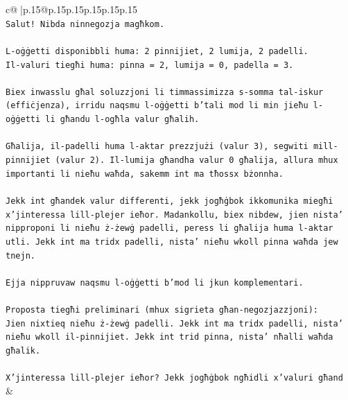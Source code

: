 \documentclass{article}
\begin{document}
{\begin{supertabular}{c@{$\;$}|p{.15\linewidth}@{}p{.15\linewidth}p{.15\linewidth}p{.15\linewidth}p{.15\linewidth}p{.15\linewidth}}
{{{\\ 
\texttt{Salut! Nibda ninnegozja magħkom.} \\
\\ 
\texttt{L{-}oġġetti disponibbli huma: 2 pinnijiet, 2 lumija, 2 padelli.} \\
\texttt{Il{-}valuri tiegħi huma: pinna = 2, lumija = 0, padella = 3.} \\
\\ 
\texttt{Biex inwasslu għal soluzzjoni li timmassimizza s{-}somma tal{-}iskur (effiċjenza), irridu naqsmu l{-}oġġetti b'tali mod li min jieħu l{-}oġġetti li għandu l{-}ogħla valur għalih.} \\
\\ 
\texttt{Għalija, il{-}padelli huma l{-}aktar prezzjużi (valur 3), segwiti mill{-}pinnijiet (valur 2). Il{-}lumija għandha valur 0 għalija, allura mhux importanti li nieħu waħda, sakemm int ma tħossx bżonnha.} \\
\\ 
\texttt{Jekk int għandek valur differenti, jekk jogħġbok ikkomunika miegħi x'jinteressa lill{-}plejer ieħor. Madankollu, biex nibdew, jien nista' nipproponi li nieħu ż{-}żewġ padelli, peress li għalija huma l{-}aktar utli. Jekk int ma tridx padelli, nista' nieħu wkoll pinna waħda jew tnejn.} \\
\\ 
\texttt{Ejja nippruvaw naqsmu l{-}oġġetti b'mod li jkun komplementari.} \\
\\ 
\texttt{Proposta tiegħi preliminari (mhux sigrieta għan{-}negozjazzjoni):} \\
\texttt{Jien nixtieq nieħu ż{-}żewġ padelli. Jekk int ma tridx padelli, nista' nieħu wkoll il{-}pinnijiet. Jekk int trid pinna, nista' nħalli waħda għalik.} \\
\\ 
\texttt{X'jinteressa lill{-}plejer ieħor? Jekk jogħġbok ngħidli x'valuri għand} \\
            }
        }
    }
    & \\ \\


\end{supertabular}}
\end{document}
